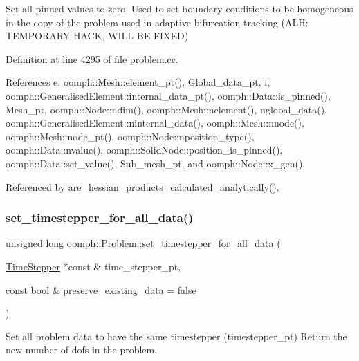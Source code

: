 Set all pinned values to zero. Used to set boundary conditions to be homogeneous in the copy of the problem used in adaptive bifurcation tracking (A\+LH\+: T\+E\+M\+P\+O\+R\+A\+RY H\+A\+CK, W\+I\+LL BE F\+I\+X\+ED) 



Definition at line 4295 of file problem.\+cc.



References e, oomph\+::\+Mesh\+::element\+\_\+pt(), Global\+\_\+data\+\_\+pt, i, oomph\+::\+Generalised\+Element\+::internal\+\_\+data\+\_\+pt(), oomph\+::\+Data\+::is\+\_\+pinned(), Mesh\+\_\+pt, oomph\+::\+Node\+::ndim(), oomph\+::\+Mesh\+::nelement(), nglobal\+\_\+data(), oomph\+::\+Generalised\+Element\+::ninternal\+\_\+data(), oomph\+::\+Mesh\+::nnode(), oomph\+::\+Mesh\+::node\+\_\+pt(), oomph\+::\+Node\+::nposition\+\_\+type(), oomph\+::\+Data\+::nvalue(), oomph\+::\+Solid\+Node\+::position\+\_\+is\+\_\+pinned(), oomph\+::\+Data\+::set\+\_\+value(), Sub\+\_\+mesh\+\_\+pt, and oomph\+::\+Node\+::x\+\_\+gen().



Referenced by are\+\_\+hessian\+\_\+products\+\_\+calculated\+\_\+analytically().

\mbox{\label{classoomph_1_1Problem_a7be66e9917b39eaea90b91389f5a72fb}} 
\subsubsection{\texorpdfstring{set\+\_\+timestepper\+\_\+for\+\_\+all\+\_\+data()}{set\_timestepper\_for\_all\_data()}}
{\footnotesize\ttfamily unsigned long oomph\+::\+Problem\+::set\+\_\+timestepper\+\_\+for\+\_\+all\+\_\+data (\begin{DoxyParamCaption}\item[{\hyperlink{classoomph_1_1TimeStepper}{Time\+Stepper} $\ast$const \&}]{time\+\_\+stepper\+\_\+pt,  }\item[{const bool \&}]{preserve\+\_\+existing\+\_\+data = {\ttfamily false} }\end{DoxyParamCaption})}



Set all problem data to have the same timestepper (timestepper\+\_\+pt) Return the new number of dofs in the problem. 

